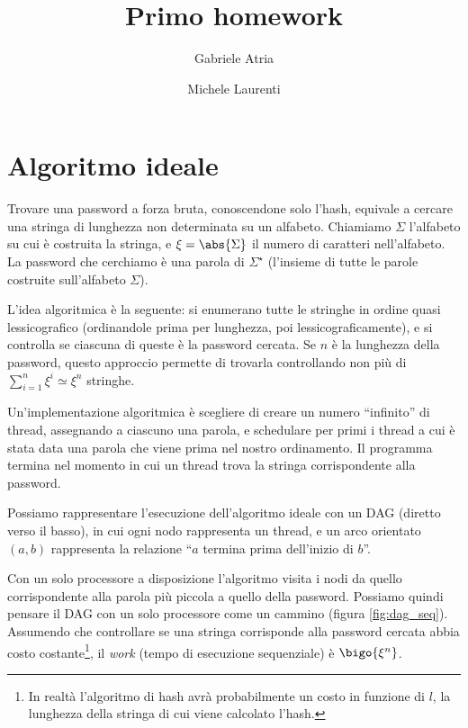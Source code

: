 \documentclass[]{myarticle}
\author{Gabriele Atria \and Michele Laurenti}
\begin{document}
\title{Primo homework}
\maketitle

\section{Algoritmo ideale}

Trovare una password a forza bruta, conoscendone solo l'hash, equivale a cercare una stringa di lunghezza non determinata su un alfabeto.
Chiamiamo $\Sigma$ l'alfabeto su cui \`e costruita la stringa, e $\xi = \abs{\Sigma}$ il numero di caratteri nell'alfabeto.
La password che cerchiamo \`e una parola di $\Sigma^{\star}$ (l'insieme di tutte le parole costruite sull'alfabeto $\Sigma$).

L'idea algoritmica \`e la seguente: si enumerano tutte le stringhe in ordine quasi lessicografico (ordinandole prima per lunghezza, poi lessicograficamente), e si controlla se ciascuna di queste \`e la password cercata.
Se $n$ \`e la lunghezza della password, questo approccio permette di trovarla controllando non pi\`u di $\sum_{i = 1}^{n} \xi^i \simeq \xi^n$ stringhe.

Un'implementazione algoritmica \`e scegliere di creare un numero ``infinito'' di thread, assegnando a ciascuno una parola, e schedulare per primi i thread a cui \`e stata data una parola che viene prima nel nostro ordinamento.
Il programma termina nel momento in cui un thread trova la stringa corrispondente alla password.

Possiamo rappresentare l'esecuzione dell'algoritmo ideale con un DAG (diretto verso il basso), in cui ogni nodo rappresenta un thread, e un arco orientato $(a,b)$ rappresenta la relazione ``$a$ termina prima dell'inizio di $b$''.

Con un solo processore a disposizione l'algoritmo visita i nodi da quello corrispondente alla parola pi\`u piccola a quello della password.
Possiamo quindi pensare il DAG con un solo processore come un cammino (figura \ref{fig:dag_seq}).
Assumendo che controllare se una stringa corrisponde alla password cercata abbia costo costante\footnote{In realt\`a l'algoritmo di hash avr\`a probabilmente un costo in funzione di $l$, la lunghezza della stringa di cui viene calcolato l'hash.}, il \emph{work} (tempo di esecuzione sequenziale) \`e $\bigo{\xi^n}$.
\end{document}
